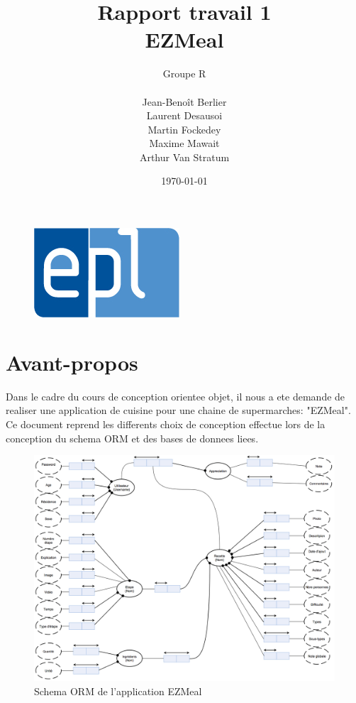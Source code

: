 \documentclass[a4paper,10pt]{report}
\title{Rapport travail 1 \\EZMeal}
\author{Groupe R\\ \\Jean-Benoît Berlier\\Laurent Desausoi \\ Martin Fockedey \\Maxime Mawait \\Arthur Van Stratum 
}
\date{\today}
\begin{document}
\begin{titlepage}
\begin{figure}[t]
\includegraphics[scale=0.3]{epl-logo.jpg}
\end{figure}

\maketitle 
\end{titlepage}

\tableofcontents

\pagebreak

\chapter{Avant-propos}

Dans le cadre du cours de conception orientee objet, il nous a ete demande de realiser une application de cuisine pour une chaine de supermarches: "EZMeal".
Ce document reprend les differents choix de conception effectue lors de la conception du schema ORM et des bases de donnees liees.

\begin{figure}[!h]
	\center
	\includegraphics[scale = 0.2]{SchemaORM.jpg}
	\caption{Schema ORM de l'application EZMeal}
	\label{ORM}
\end{figure}
\end{document}
